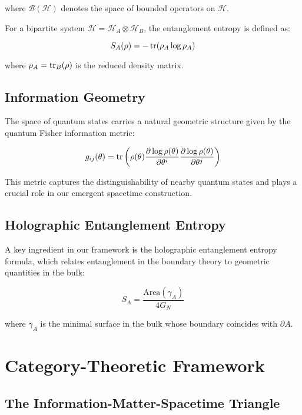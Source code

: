 \documentclass[12pt,a4paper]{article}
\begin{document}
where $\mathcal{B}(\mathcal{H})$ denotes the space of bounded operators on $\mathcal{H}$.

For a bipartite system $\mathcal{H} = \mathcal{H}_A \otimes \mathcal{H}_B$, the entanglement entropy is defined as:

\begin{equation}
S_A(\rho) = -\tr(\rho_A \log \rho_A)
\end{equation}

where $\rho_A = \tr_B(\rho)$ is the reduced density matrix.

\subsection{Information Geometry}

The space of quantum states carries a natural geometric structure given by the quantum Fisher information metric:

\begin{equation}
g_{ij}(\theta) = \tr\left(\rho(\theta) \frac{\partial \log \rho(\theta)}{\partial \theta^i} \frac{\partial \log \rho(\theta)}{\partial \theta^j}\right)
\end{equation}

This metric captures the distinguishability of nearby quantum states and plays a crucial role in our emergent spacetime construction.

\subsection{Holographic Entanglement Entropy}

A key ingredient in our framework is the holographic entanglement entropy formula, which relates entanglement in the boundary theory to geometric quantities in the bulk:

\begin{equation}
S_A = \frac{\text{Area}(\gamma_A)}{4G_N}
\end{equation}

where $\gamma_A$ is the minimal surface in the bulk whose boundary coincides with $\partial A$.

\section{Category-Theoretic Framework}

\subsection{The Information-Matter-Spacetime Triangle}
\end{document}
